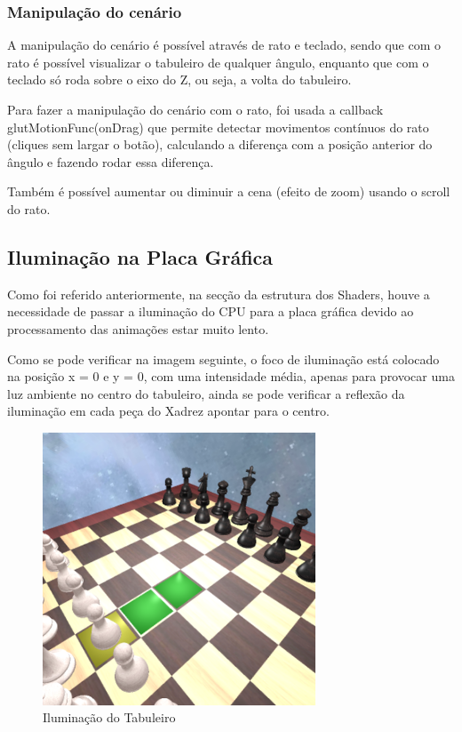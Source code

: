 \documentclass[portugues,final]{revdetua}
\begin{document}
\subsubsection{Manipulação do cenário}

A manipulação do cenário é possível através de rato e teclado, sendo que com o rato é possível visualizar o tabuleiro de qualquer ângulo, enquanto que com o teclado só roda sobre o eixo do Z, ou seja, a volta do tabuleiro.

Para fazer a manipulação do cenário com o rato, foi usada a callback glutMotionFunc(onDrag) que permite detectar movimentos contínuos do rato (cliques sem largar o botão), calculando a diferença com a posição anterior do ângulo e fazendo rodar essa diferença.

Também é possível aumentar ou diminuir a cena (efeito de zoom) usando o scroll do rato.

\subsection{Iluminação na Placa Gráfica}

Como foi referido anteriormente, na secção da estrutura dos Shaders, houve a necessidade de passar a iluminação do CPU para a placa gráfica devido ao processamento das animações estar muito lento.

Como se pode verificar na imagem seguinte, o foco de iluminação está colocado na posição x = 0 e y = 0, com uma intensidade média, apenas para provocar uma luz ambiente no centro do tabuleiro, ainda se pode verificar a reflexão da iluminação em cada peça do Xadrez apontar para o centro.

\begin{figure}[H]
\centerline{\includegraphics[width=230pt]{images/illumination.png}}
\caption{Iluminação do Tabuleiro}
\label{img:complete}
\end{figure}
\end{document}
